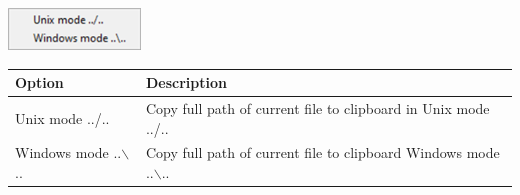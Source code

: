 \includegraphics[scale=0.50]{./res/menu_file_copyfullpathtoclipboard.png}\\

\begin{scriptsize}
  \begin{tabularx}{\textwidth}{>{\hsize=0.3\hsize}X>{\hsize=0.8\hsize}X}\\
    \hline
    \textbf{Option} & \textbf{Description} \\
    \hline
    Unix mode ../.. & Copy full path of current file to clipboard in Unix mode ../.. \\
    Windows mode ..$\backslash$.. & Copy full path of current file to clipboard Windows mode ..$\backslash$.. \\
    \hline
  \end{tabularx}
\end{scriptsize}
